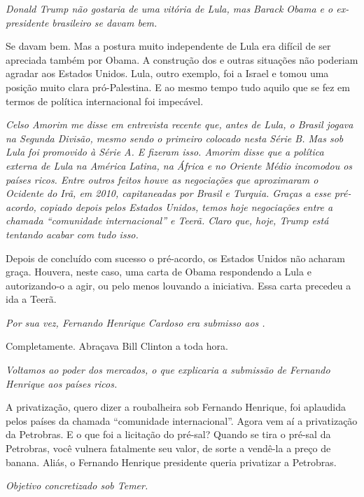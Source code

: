 \itshape
 Donald Trump não gostaria de uma vitória de Lula, mas
Barack Obama e o ex-presidente brasileiro se davam bem.

\normalfont
Se davam bem. Mas a postura muito independente de Lula
era difícil de ser apreciada também por Obama. A construção dos  e
outras situações não poderiam agradar aos Estados Unidos. Lula, outro
exemplo, foi a Israel e tomou uma posição muito clara pró-Palestina. E
ao mesmo tempo tudo aquilo que se fez em termos de política
internacional foi impecável.

\itshape
 Celso Amorim me disse em entrevista recente que, antes
de Lula, o Brasil jogava na Segunda Divisão, mesmo sendo o primeiro
colocado nesta Série B. Mas sob Lula foi promovido à Série A. E fizeram
isso. Amorim disse que a política externa de Lula na América Latina, na
África e no Oriente Médio incomodou os países ricos. Entre outros feitos
houve as negociações que aproximaram o Ocidente do Irã, em 2010,
capitaneadas por Brasil e Turquia. Graças a esse pré-acordo, copiado
depois pelos Estados Unidos, temos hoje negociações entre a chamada
``comunidade internacional'' e Teerã. Claro que, hoje, Trump está
tentando acabar com tudo isso.

\normalfont
Depois de concluído com sucesso o pré-acordo, os Estados
Unidos não acharam graça. Houvera, neste caso, uma carta de Obama
respondendo a Lula e autorizando-o a agir, ou pelo menos louvando a
iniciativa. Essa carta precedeu a ida a Teerã.

\itshape
 Por sua vez, Fernando Henrique Cardoso era submisso aos
.

\normalfont
Completamente. Abraçava Bill Clinton a toda hora.

\itshape
 Voltamos ao poder dos mercados, o que explicaria a
submissão de Fernando Henrique aos países ricos.

\normalfont
A privatização, quero dizer a roubalheira sob Fernando
Henrique, foi aplaudida pelos países da chamada ``comunidade
internacional''. Agora vem aí a privatização da Petrobras. E o que foi a
licitação do pré-sal? Quando se tira o pré-sal da Petrobras, você
vulnera fatalmente seu valor, de sorte a vendê-la a preço de banana.
Aliás, o Fernando Henrique presidente queria privatizar a Petrobras.

\itshape
 Objetivo concretizado sob Temer.

